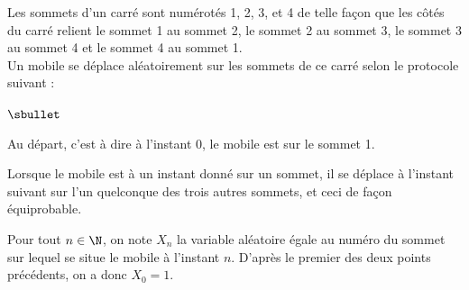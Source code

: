 \documentclass[11pt]{article}%
\begin{document}
\noindent
Les sommets d'un carré sont numérotés 1, 2, 3, et 4 de telle façon que
les côtés du carré relient le sommet 1 au sommet 2, le sommet 2 au
sommet 3, le sommet 3 au sommet 4 et le sommet 4 au sommet 1.\\
Un mobile se déplace aléatoirement sur les sommets de ce carré selon
le protocole suivant :
\begin{noliste}{$\sbullet$}
\item Au départ, c'est à dire à l'instant $0$, le mobile est sur le
  sommet 1.
\item Lorsque le mobile est à un instant donné sur un sommet, il se
  déplace à l'instant suivant sur l'un quelconque des trois autres
  sommets, et ceci de façon équiprobable.
\end{noliste}
Pour tout $n \in \N$, on note $X_{n}$ la variable aléatoire égale au
numéro du sommet sur lequel se situe le mobile à l'instant
$n$. D'après le premier des deux points précédents, on a donc $X_{0} =
1$.
\end{document}
